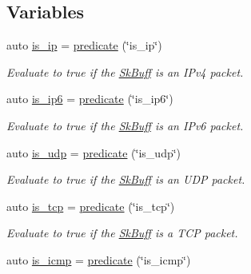 \subsection*{Variables}
\begin{DoxyCompactItemize}
\item 
auto \hyperlink{namespacepfq_1_1lang_1_1anonymous__namespace_02default_8hpp_03_aa97a34e12e4c6bc2d85a5c169800cfa4}{is\+\_\+ip} = \hyperlink{namespacepfq_1_1lang_a6c156f209614d0291b280153416dba97}{predicate} (\char`\"{}is\+\_\+ip\char`\"{})
\begin{DoxyCompactList}\small\item\em Evaluate to {\ttfamily true} if the \hyperlink{structpfq_1_1lang_1_1SkBuff}{Sk\+Buff} is an I\+Pv4 packet. \end{DoxyCompactList}\item 
auto \hyperlink{namespacepfq_1_1lang_1_1anonymous__namespace_02default_8hpp_03_a5fa35e94e399b76838b7be894d85b83c}{is\+\_\+ip6} = \hyperlink{namespacepfq_1_1lang_a6c156f209614d0291b280153416dba97}{predicate} (\char`\"{}is\+\_\+ip6\char`\"{})
\begin{DoxyCompactList}\small\item\em Evaluate to {\ttfamily true} if the \hyperlink{structpfq_1_1lang_1_1SkBuff}{Sk\+Buff} is an I\+Pv6 packet. \end{DoxyCompactList}\item 
auto \hyperlink{namespacepfq_1_1lang_1_1anonymous__namespace_02default_8hpp_03_a42701f36d9dde7f3636b90244d520a16}{is\+\_\+udp} = \hyperlink{namespacepfq_1_1lang_a6c156f209614d0291b280153416dba97}{predicate} (\char`\"{}is\+\_\+udp\char`\"{})
\begin{DoxyCompactList}\small\item\em Evaluate to {\ttfamily true} if the \hyperlink{structpfq_1_1lang_1_1SkBuff}{Sk\+Buff} is an U\+D\+P packet. \end{DoxyCompactList}\item 
auto \hyperlink{namespacepfq_1_1lang_1_1anonymous__namespace_02default_8hpp_03_a67fe3072aa5353c1526aa04320d40137}{is\+\_\+tcp} = \hyperlink{namespacepfq_1_1lang_a6c156f209614d0291b280153416dba97}{predicate} (\char`\"{}is\+\_\+tcp\char`\"{})
\begin{DoxyCompactList}\small\item\em Evaluate to {\ttfamily true} if the \hyperlink{structpfq_1_1lang_1_1SkBuff}{Sk\+Buff} is a T\+C\+P packet. \end{DoxyCompactList}\item 
auto \hyperlink{namespacepfq_1_1lang_1_1anonymous__namespace_02default_8hpp_03_a01ccba89c8582ba423393226b54f12de}{is\+\_\+icmp} = \hyperlink{namespacepfq_1_1lang_a6c156f209614d0291b280153416dba97}{predicate} (\char`\"{}is\+\_\+icmp\char`\"{})

\end{DoxyCompactItemize}
